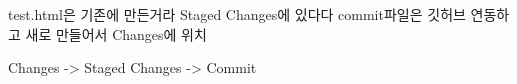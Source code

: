 test.html은 기존에 만든거라 Staged Changes에 있다다
commit파일은 깃허브 연동하고 새로 만들어서 Changes에 위치

Changes -> Staged Changes -> Commit